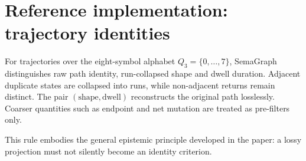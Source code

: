 \documentclass[11pt,a4paper]{article}
\begin{document}
\section{Reference implementation: trajectory identities}
For trajectories over the eight-symbol alphabet $Q_3=\{0,\ldots,7\}$, SemaGraph distinguishes raw path identity, run-collapsed shape and dwell duration. Adjacent duplicate states are collapsed into runs, while non-adjacent returns remain distinct. The pair $(\text{shape},\text{dwell})$ reconstructs the original path losslessly. Coarser quantities such as endpoint and net mutation are treated as pre-filters only.

This rule embodies the general epistemic principle developed in the paper: a lossy projection must not silently become an identity criterion.


\small
\end{document}
